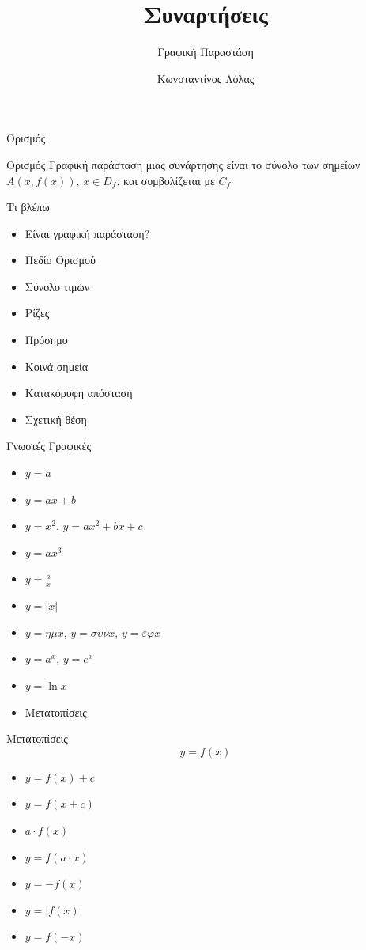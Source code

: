 \documentclass{presentation}
\title{Συναρτήσεις}
\subtitle{Γραφική Παραστάση}
\author[Λόλας]{Κωνσταντίνος Λόλας }
\begin{document}
\begin{frame}
  \titlepage
\end{frame}

\begin{frame}{Ορισμός}
  \begin{block}{Ορισμός}
    Γραφική παράσταση μιας συνάρτησης είναι το σύνολο των σημείων $A(x,f(x))$, $x\in D_f$, και συμβολίζεται με $C_f$
  \end{block}
\end{frame}

\begin{frame}{Τι βλέπω}
  \begin{itemize}
    \item<1-> Είναι γραφική παράσταση?
    \item<2-> Πεδίο Ορισμού
    \item<3-> Σύνολο τιμών
    \item<4-> Ρίζες
    \item<5-> Πρόσημο
    \item<6-> Κοινά σημεία
    \item<7-> Κατακόρυφη απόσταση
    \item<8-> Σχετική θέση
  \end{itemize}
\end{frame}

\begin{frame}{Γνωστές Γραφικές}
  \begin{itemize}
    \item<1-> $y=a$
    \item<2-> $y=ax+b$
    \item<3-> $y=x^2$, $y=ax^2+bx+c$
    \item<4-> $y=ax^3$
    \item<5-> $y=\frac{a}{x}$
    \item<6-> $y=|x|$
    \item<7-> $y=ημ x$, $y=συν x$, $y=εφ x$
    \item<8-> $y=a^x$, $y=e^x$
    \item<9-> $y=\ln x$
    \item<10-> Μετατοπίσεις
  \end{itemize}
\end{frame}

\begin{frame}{Μετατοπίσεις}
  $$y=f(x)$$
  \begin{itemize}
    \item<1-> $y=f(x)+c$
    \item<2-> $y=f(x+c)$
    \item<3-> $a\cdot f(x)$
    \item<4-> $y=f(a\cdot x)$
    \item<5-> $y=-f(x)$
    \item<6-> $y=|f(x)|$
    \item<7-> $y=f(-x)$
  \end{itemize}
\end{frame}
\end{document}
